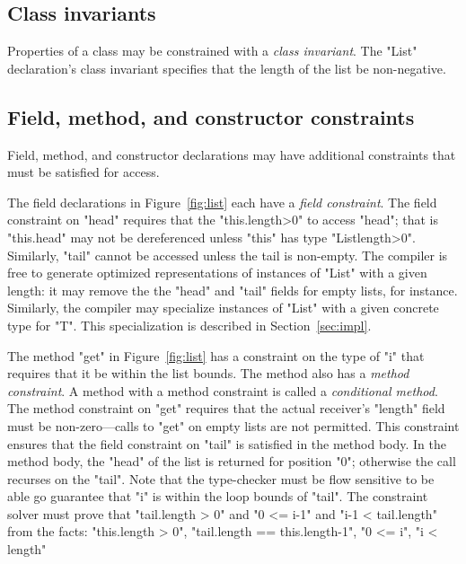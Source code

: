 \documentclass[preprint,nocopyrightspace,9pt]{sigplanconf}
\begin{document}
\subsection{Class invariants}

Properties of a class may be constrained with 
a \emph{class invariant}.   
The \xcd"List" declaration's class invariant specifies that the length of
the list be non-negative.

\subsection{Field, method, and constructor constraints}

Field, method, and constructor declarations may have additional
constraints that must be satisfied for access.

The field  declarations in Figure~\ref{fig:list}
each have a \emph{field constraint}.  The field constraint on
\xcd"head" requires that the \xcd"this.length>0" to access
\xcd"head"; that is \xcd"this.head" may not be dereferenced
unless \xcd"this" has type \xcd"List{length>0}".  Similarly,
\xcd"tail" cannot be accessed unless the tail is non-empty.  The
compiler is free to generate optimized representations of
instances of \xcd"List" with a given length: it may remove the
the \xcd"head" and \xcd"tail" fields for empty lists, for
instance.  Similarly, the compiler may specialize instances of
\xcd"List" with a given concrete type for \xcd"T".  This
specialization is described in Section~\ref{sec:impl}.

The method \xcd"get" in Figure~\ref{fig:list}
has a constraint on the type of \xcd"i" that requires
that it be within the list bounds.
The method also has a \emph{method constraint}.
A method with a method constraint is called a \emph{conditional method}.
The method constraint on \xcd"get" requires that the actual
receiver's
\xcd"length" field must be non-zero---calls to \xcd"get" on empty lists are not
permitted.  This constraint ensures that the field constraint on
\xcd"tail" is satisfied in the method body.
In the method body, the \xcd"head" of the list is returned for
position \xcd"0"; otherwise the call recurses on the \xcd"tail".
Note that the type-checker must be flow sensitive to be able go
guarantee that \xcd"i" is within the loop bounds of \xcd"tail".
The constraint solver must prove that \xcd"tail.length > 0" and
\xcd"0 <= i-1" and \xcd"i-1 < tail.length" from the facts:
\xcd"this.length > 0", \xcd"tail.length == this.length-1",
\xcd"0 <= i", \xcd"i < length"
\end{document}
